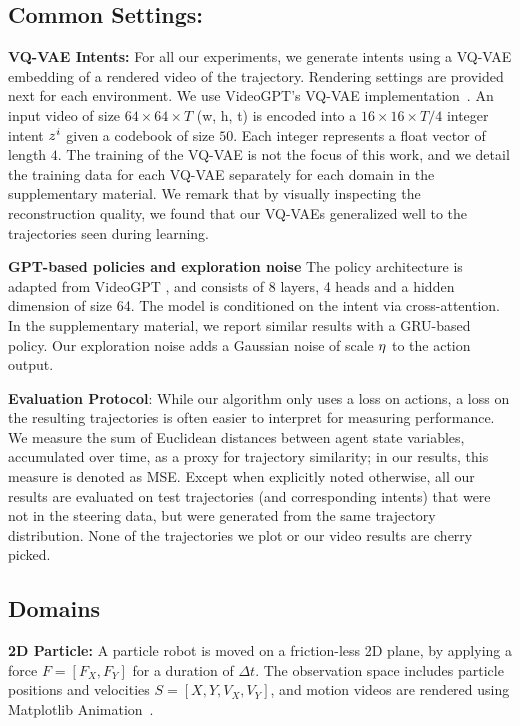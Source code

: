\documentclass[nohyperref]{article}
\begin{document}
\subsection*{Common Settings:} 
\textbf{VQ-VAE Intents:} For all our experiments, we generate intents using a VQ-VAE embedding of a rendered video of the trajectory. Rendering settings are provided next for each environment. We use VideoGPT's VQ-VAE implementation~\citep{yan2021videogpt}. An input video of size $64 \times 64 \times T$ (w, h, t) is encoded into a $16 \times 16 \times T/4$ integer intent ${z}^i$ given a codebook of size $50$. Each integer represents a float vector of length $4$. The training of the VQ-VAE is not the focus of this work, and we detail the training data for each VQ-VAE separately for each domain in the supplementary material. We remark that by visually inspecting the reconstruction quality, we found that our VQ-VAEs generalized well to the trajectories seen during learning.

\textbf{GPT-based policies and exploration noise} The policy architecture is adapted from VideoGPT \citep{yan2021videogpt}, and consists of 8 layers, 4 heads and a hidden dimension of size 64. The model is conditioned on the intent via cross-attention. In the supplementary material, we report similar results with a GRU-based policy. Our exploration noise adds a Gaussian noise of scale $\eta$ to the action output. 


\textbf{Evaluation Protocol}: 
While our algorithm only uses a loss on actions, a loss on the resulting trajectories is often easier to interpret for measuring performance. We measure the sum of Euclidean distances between agent state variables, accumulated over time, as a proxy for trajectory similarity; in our results, this measure is denoted as MSE. 
Except when explicitly noted otherwise, all our results are evaluated on test trajectories (and corresponding intents) that were not in the steering data, but were generated from the same trajectory distribution. None of the trajectories we plot or our video results are cherry picked.

\subsection*{Domains}
\textbf{2D Particle:}
\label{ssec:domains_particle}
A particle robot is moved on a friction-less 2D plane, by applying a force $F=[F_X,F_Y]$ for a duration of $\Delta t$.
The observation space includes particle positions and velocities $S=[X,Y,V_X,V_Y]$, and motion videos are rendered using Matplotlib Animation~\citep{Hunter:2007}. 
\end{document}
